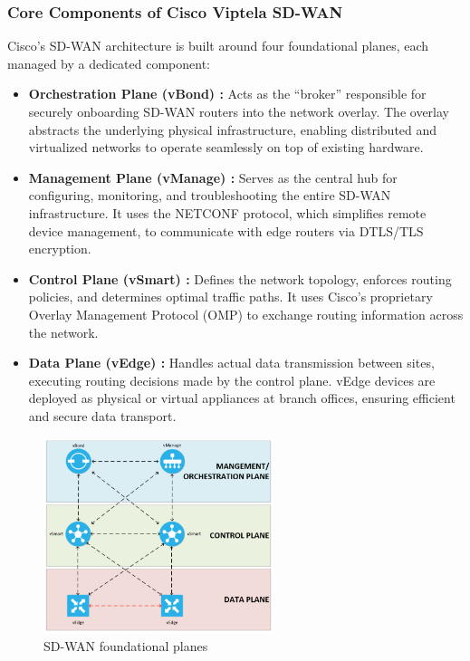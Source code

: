 \documentclass[12pt,english]{report}
\begin{document}
\subsubsection{Core Components of Cisco Viptela SD-WAN}
Cisco’s SD-WAN architecture is built around four foundational planes, each managed by a dedicated component:
        \begin{itemize}
            \item \textbf{Orchestration Plane (vBond) :} Acts as the “broker” responsible for securely onboarding SD-WAN routers into the network overlay. The overlay abstracts the underlying physical infrastructure, enabling distributed and virtualized networks to operate seamlessly on top of existing hardware.
            \item \textbf{Management Plane (vManage) :} Serves as the central hub for configuring, monitoring, and troubleshooting the entire SD-WAN infrastructure. It uses the NETCONF protocol, which simplifies remote device management, to communicate with edge routers via DTLS/TLS encryption.
            \item \textbf{Control Plane (vSmart) :} Defines the network topology, enforces routing policies, and determines optimal traffic paths. It uses Cisco’s proprietary Overlay Management Protocol (OMP) to exchange routing information across the network.
            \item \textbf{Data Plane (vEdge) :} Handles actual data transmission between sites, executing routing decisions made by the control plane. vEdge devices are deployed as physical or virtual appliances at branch offices, ensuring efficient and secure data transport\cite{ref13}.
        \end{itemize}
\begin{figure}[H]
    \centering
    \includegraphics[width= 0.6\textwidth]{chapter1/SD-WAN planes.png}
    \caption{SD-WAN foundational planes\cite{ref14}}
    \label{fig: SD-WAN foundational planes}
\end{figure}
\end{document}
